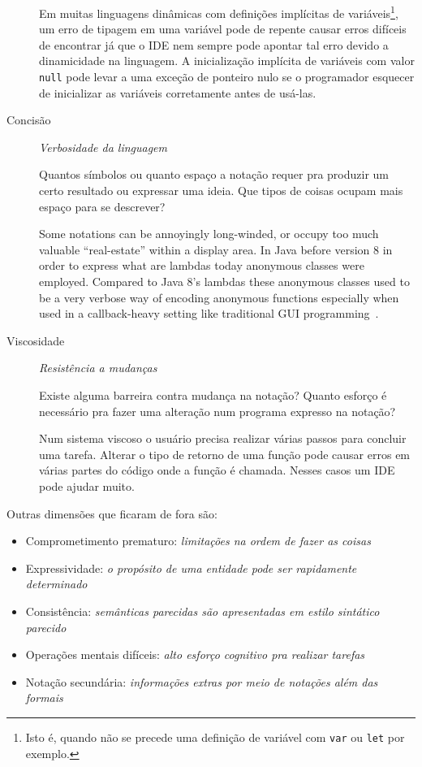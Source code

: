 \begin{description}
Em muitas linguagens dinâmicas com definições implícitas de
variáveis\footnote{Isto é, quando não se precede uma definição de variável
com \texttt{var} ou \texttt{let} por exemplo.}, um erro de tipagem em uma variável pode
de repente causar erros difíceis de encontrar já que o IDE nem sempre
pode apontar tal erro devido a dinamicidade na linguagem. A inicialização
implícita de variáveis com valor \texttt{null} pode levar a uma exceção de
ponteiro nulo se o programador esquecer de inicializar as variáveis
corretamente antes de usá-las.

\item[{Concisão        }] \emph{Verbosidade da linguagem}

Quantos símbolos ou quanto espaço a notação requer pra produzir um certo
resultado ou expressar uma ideia. Que tipos de coisas ocupam mais espaço
para se descrever?

\begin{citacao}
  Some notations can be annoyingly long-winded, or occupy too much valuable
  “real-estate” within a display area. In Java before version 8 in order to
  express what are lambdas today anonymous classes were employed. Compared to
  Java 8’s lambdas these anonymous classes used to be a very verbose way of
  encoding anonymous functions especially when used in a callback-heavy setting
  like traditional GUI programming~\cite[p.~14]{kiss2014}.
\end{citacao}

\item[{Viscosidade    }] \emph{Resistência a mudanças}

Existe alguma barreira contra mudança na notação? Quanto esforço é
necessário pra fazer uma alteração num programa expresso na notação?

Num sistema viscoso o usuário precisa realizar várias passos para
concluir uma tarefa. Alterar o tipo de retorno de uma função pode causar
erros em várias partes do código onde a função é chamada. Nesses casos um
IDE pode ajudar muito.
\end{description}


Outras dimensões que ficaram de fora são:

\begin{itemize}
\item Comprometimento prematuro: \emph{limitações na ordem de fazer as coisas}
\item Expressividade: \emph{o propósito de uma entidade pode ser rapidamente determinado}
\item Consistência: \emph{semânticas parecidas são apresentadas em estilo sintático
parecido}
\item Operações mentais difíceis: \emph{alto esforço cognitivo pra realizar tarefas}
\item Notação secundária: \emph{informações extras por meio de notações além das
formais}
\end{itemize}


